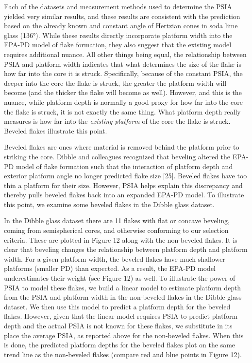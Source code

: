 \documentclass[10pt,letterpaper]{article}
\begin{document}
Each of the datasets and measurement methods used to determine the PSIA
yielded very similar results, and these results are consistent with the
prediction based on the already known and constant angle of Hertzian
cones in soda lime glass (136°). While these results directly
incorporate platform width into the EPA-PD model of flake formation,
they also suggest that the existing model requires additional nuance.
All other things being equal, the relationship between PSIA and platform
width indicates that what determines the size of the flake is how far
into the core it is struck. Specifically, because of the constant PSIA,
the deeper into the core the flake is struck, the greater the platform
width will become (and the thicker the flake will become as well).
However, and this is the nuance, while platform depth is normally a good
proxy for how far into the core the flake is struck, it is not exactly
the same thing. What platform depth really measures is how far into the
\emph{existing platform} of the core the flake is struck. Beveled flakes
illustrate this point.

Beveled flakes are ones where material is removed behind the platform
prior to striking the core. Dibble and colleagues recognized that
beveling altered the EPA-PD model of flake formation such that the
interaction of platform depth and exterior platform angle no longer
predicted flake size {[}25{]}. Beveled flakes have too thin a platform
for their size. However, PSIA helps explain this discrepancy and thereby
pulls beveled flakes back into an expanded EPA-PD model. To illustrate
this point, we examine some beveled flakes in the Dibble glass dataset.

In the Dibble glass dataset there are 11 flakes with flat or concave
beveling, coming from semispherical cores, and otherwise conforming to
our selection criteria. These are plotted in Figure 12 along with the
non-beveled flakes. It is clear that beveling changes the relationship
between platform depth and platform width. For a given platform width,
the beveled flakes have much shallower platforms (smaller PD) than
expected. As a result, the EPA-PD model underestimates their weight (see
Figure 12) as well. To illustrate the power of PSIA to model these
flakes, we build a linear model to estimate platform depth from the PSIA
and platform width in the non-beveled flakes in the Dibble glass
dataset. We then use this model to predict a platform depth for the
beveled flakes. However, given that the linear model requires PSIA to
predict platform depth and the actual PSIA is not known for these
flakes, we substitute in its place the average PSIA, as reported above
for the non-beveled flakes. When this is done, the predicted platform
depths for the beveled flakes plot on the same trend line as the
non-beveled flakes (compare red and blue points in Figure 12).
\end{document}
